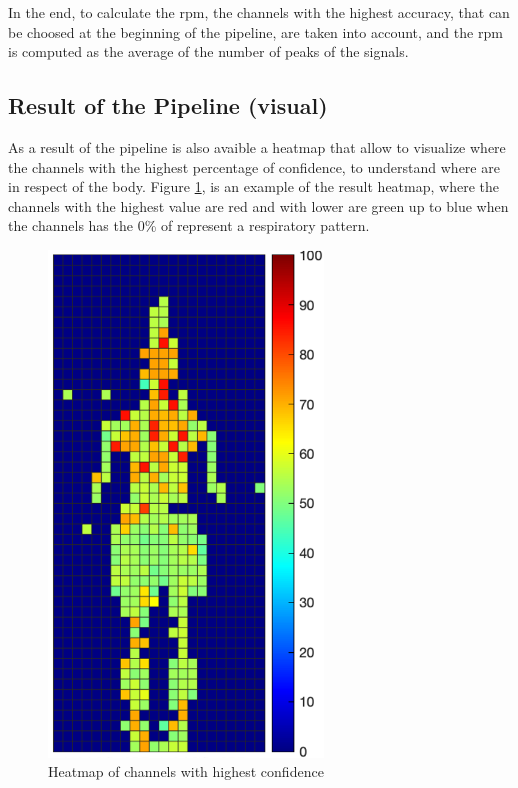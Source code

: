 In the end, to calculate the rpm, the channels with the highest accuracy, that can be choosed at the beginning of the pipeline, are taken into account, and the rpm is computed as the average of the number of peaks of the signals.

\subsection{Result of the Pipeline (visual)}
As a result of the pipeline is also avaible a heatmap that allow to visualize where the channels with the highest percentage of confidence, to understand where are in respect of the body. Figure \ref{fig:heat}, is an example of the result heatmap, where the channels with the highest value are red and with lower are green up to blue when the channels has the 0\% of represent a respiratory pattern.

\begin{figure}[H]
    \centering
    \includegraphics[width=0.65\textwidth]{img/total.png}
    \caption{Heatmap of channels with highest confidence}
    \label{fig:heat}
\end{figure}

